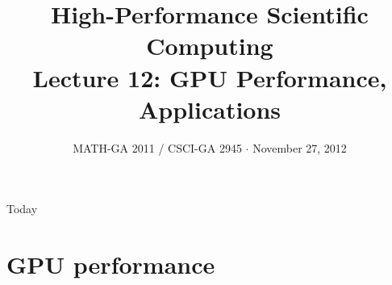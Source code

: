 \documentclass[english,compress]{beamer}
\begin{document}

\title{High-Performance Scientific Computing\\Lecture 12: GPU Performance, Applications}

\date{MATH-GA 2011 / CSCI-GA 2945 $\cdot$ November 27, 2012}

\frame{\titlepage}

\begin{frame}{Today}
  \tableofcontents[hideallsubsections]
\end{frame}
\begin{comment}
\begin{frame}{Bits and pieces}
  \begin{itemize}
    \item Don't have a project? Let's fix that \emph{very soon}
    \item HW5: soon
    \item HW6: due today
    \item Dec 5: Last day of regular class
    \item Dec 12: Legislative Day
    \item Dec 17/18/\textbf{19}: Project presentations
    \item Don't have grade reports for HW1\dots4? Talk to me
  \end{itemize}
\end{frame}
\end{comment}

\section{GPU performance}
\end{document}
